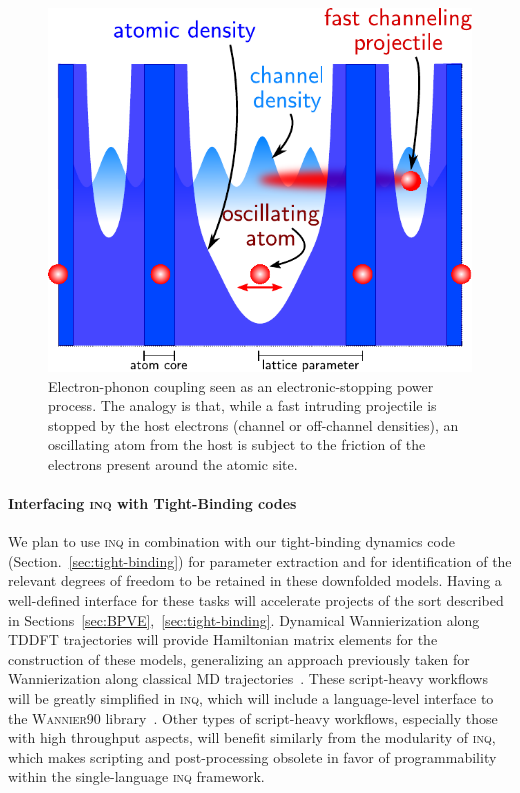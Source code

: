 \begin{figure}
\centering
\includegraphics[width=0.66\columnwidth]{figures/stopping_eph}
\caption{
	Electron-phonon coupling seen as an electronic-stopping power process. 
	The analogy is that, while a fast intruding projectile is stopped by the host electrons (channel or off-channel densities), an oscillating atom from the host is subject to the friction of the electrons present around the atomic site.
}
\label{fig:stopping_eph}
\end{figure}


\paragraph{Interfacing \textsc{inq} with Tight-Binding codes}\label{sec:future-tb}

We plan to use \textsc{inq} in combination with our tight-binding dynamics code (Section.~\ref{sec:tight-binding}) for parameter extraction and for identification of the relevant degrees of freedom to be retained in these downfolded models. 
Having a well-defined interface for these tasks will accelerate projects of the sort described in Sections~\ref{sec:BPVE},~\ref{sec:tight-binding}. Dynamical Wannierization along TDDFT trajectories will provide Hamiltonian matrix elements for the construction of these models, generalizing an approach previously taken for Wannierization along classical MD trajectories~\cite{Abramovitch2021}. 
These script-heavy workflows will be greatly simplified in \textsc{inq}, which will include a language-level interface to the \textsc{Wannier90} library~\cite{Mostofi2008}. 
Other types of script-heavy workflows, especially those with high throughput aspects, will benefit similarly from the modularity of \textsc{inq}, which makes scripting and post-processing obsolete in favor of programmability within the single-language \textsc{inq} framework.

